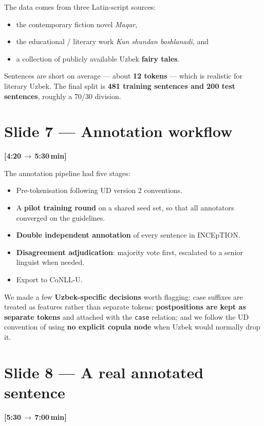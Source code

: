 \documentclass[12pt,a4paper]{article}
\newcommand{\timing}[2]{%
   \par\noindent\textbf{\small [#1\,$\to$\,#2\,min]}\par\vspace{0.2em}}
\newcommand{\say}[1]{\textbf{#1}}
\begin{document}
The data comes from three Latin-script sources:

\begin{itemize}
   \item the contemporary fiction novel \textit{Maqar},
   \item the educational / literary work \textit{Kun shundan boshlanadi}, and
   \item a collection of publicly available Uzbek \textbf{fairy tales}.
\end{itemize}

Sentences are short on average — about \textbf{12 tokens} — which is realistic
for literary Uzbek. The final split is \textbf{481 training sentences and 200
test sentences}, roughly a 70/30 division.

\section*{Slide 7 — Annotation workflow}
\timing{4:20}{5:30}

The annotation pipeline had five stages:

\begin{itemize}
   \item Pre-tokenisation following UD version 2 conventions.
   \item A \textbf{pilot training round} on a shared seed set, so that all annotators converged on the guidelines.
   \item \textbf{Double independent annotation} of every sentence in INCEpTION.
   \item \textbf{Disagreement adjudication}: majority vote first, escalated to a senior linguist when needed.
   \item Export to CoNLL-U.
\end{itemize}

\noindent
We made a few \say{Uzbek-specific decisions} worth flagging: case suffixes are
treated as features rather than separate tokens; \say{postpositions are kept as
separate tokens} and attached with the \texttt{case} relation; and we follow
the UD convention of using \say{no explicit copula node} when Uzbek would
normally drop it.

\section*{Slide 8 — A real annotated sentence}
\timing{5:30}{7:00}
\end{document}
